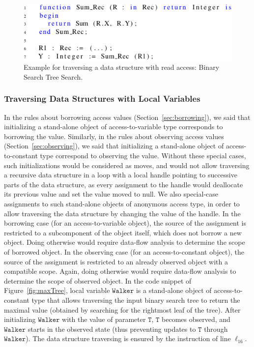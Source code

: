 \documentclass{llncs}
\newcommand\var[1]{\ensuremath{\mathtt{#1}}}
\begin{document}
\begin{figure}[htb!]
\centering
  \captionsetup{justification=centering,margin=0.6cm}
   \includegraphics[]{observingComposite}
   \caption{Example for traversing a data structure with read access: Binary Search Tree Search.}
   \label{fig:observingComposite}
\end{figure}



\subsubsection{Traversing Data Structures with Local Variables}

In the rules about borrowing access values (Section~\ref{sec:borrowing}), we said that initializing a stand-alone object of access-to-variable type corresponds to
borrowing the value. Similarly, in the rules about observing access values (Section~\ref{sec:observing}), we said that initializing a stand-alone object of
access-to-constant type correspond to observing the value. Without these special cases, such initializations would be considered as moves, and would not allow
traversing a recursive data structure in a loop with a local handle pointing to successive parts of the data structure, as every assignment to the handle would
deallocate its previous value and set the value moved to null.
We also special-case assignments to such stand-alone objects of anonymous access type, in order to allow traversing the data structure by changing the value of the handle.
In the borrowing case (for an access-to-variable object), the source of the assignment is restricted to a subcomponent of the object itself, which does not borrow a new object.
Doing otherwise would require data-flow analysis to determine the scope of borrowed object. In the observing case (for an access-to-constant object), the source of
the assignment is restricted to an already observed object with a compatible scope. Again, doing otherwise would require data-flow analysis to determine the scope of observed object.
In the code snippet of Figure~\ref{fig:maxTree}, local variable \var{Walker} is a stand-alone object of access-to-constant type that allows traversing the input binary
search tree to return the maximal value (obtained by searching for the rightmost leaf of the tree). After initializing \var{Walker} with the value of parameter \var{T},
\var{T} becomes observed, and \var{Walker} starts in the observed state (thus preventing updates to \var{T} through \var{Walker}). The data structure traversing is ensured by the instruction
of line $\ell_{16}$. 
\end{document}
